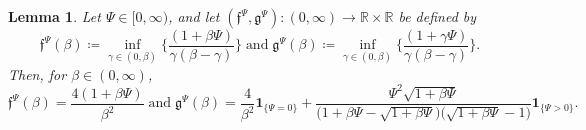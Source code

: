 \documentclass[10pt]{article} %
\newtheorem{lemma}[theorem]{Lemma}
\newcommand\ff{\mathfrak f}
\newcommand\fg{\mathfrak g}
\def \R{\mathbb{R}}
\newcommand{\1}{\mathbf{1}}
\begin{document}
\begin{lemma}\label{lem::analysis_ff_fg}
	Let $\Psi \in [0,\infty)$, and let $(\ff^\Psi,\fg^\Psi) : (0,\infty) \rightarrow \R \times \R$ be defined by
	\begin{equation*}
		\ff^\Psi(\beta) \coloneqq \inf_{\gamma\in (0,\beta)} \bigg\{\frac{(1+\beta\Psi)}{\gamma(\beta-\gamma)}\bigg\} \; \text{and} \; \fg^\Psi(\beta) \coloneqq \inf_{\gamma \in (0,\beta)} \bigg\{\frac{(1+\gamma\Psi)}{\gamma(\beta-\gamma)}\bigg\}.
	\end{equation*}
	Then, for $\beta \in (0,\infty)$,
	\begin{equation*}
		\ff^\Psi(\beta) = \frac{4(1+\beta\Psi)}{\beta^2} \; \text{and} \; \fg^\Psi(\beta) =  \frac{4}{\beta^2}\1_{\{\Psi = 0\}} + \frac{\Psi^2  \sqrt{1+\beta\Psi}}{\big(1+\beta\Psi -\sqrt{1+\beta\Psi}\big)\big(\sqrt{1+\beta\Psi}-1\big)}\1_{\{\Psi > 0\}}.
	\end{equation*}
\end{lemma}
\end{document}
